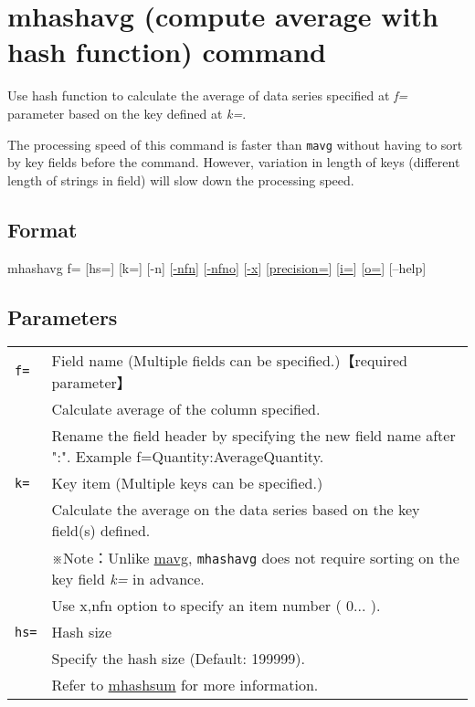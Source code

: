 \documentclass[a4paper]{jarticle}
\begin{document}
\setlength{\baselineskip}{4mm}

\section*{mhashavg (compute average with hash function) command}
Use hash function to calculate the average of data series specified at \emph{f=} parameter based on the key defined at \emph{k=}. 

The processing speed of this command is faster than \verb|mavg| without having to sort by key fields before the command. However, variation in length of keys (different length of strings in field) will slow down the processing speed. 

\subsection*{Format}
mhashavg f= [hs=] [k=] [-n] 
[\href{run:option.pdf}{-nfn}] 
[\href{run:option.pdf}{-nfno}] 
[\href{run:option.pdf}{-x}] 
[\href{run:option.pdf}{precision=}] 
[\href{run:option.pdf}{i=}] 
[\href{run:option.pdf}{o=}] 
[--help]\\

\subsection*{Parameters}
\begin{table}[htbp]
{\small
\begin{tabular}{ll}
\verb|f=|    & Field name (Multiple fields can be specified.)【required parameter】\\
& Calculate average of the column specified. \\
& Rename the field header by specifying the new field name after ":". Example f=Quantity:AverageQuantity. \\
\verb|k=|    & Key item (Multiple keys can be specified.)\\
& Calculate the average on the data series based on the key field(s) defined. \\
& ※Note：Unlike \href{run:mavg.pdf} {mavg}, \verb|mhashavg| does not require sorting on the key field \emph{k=} in advance.  \\
& Use x,nfn option to specify an item number ( 0... ).\\
\verb|hs=|    & Hash size \\
& Specify the hash size (Default: 199999).\\
& Refer to \href{run:mhashsum.pdf}{mhashsum} for more information.
\end{tabular} 
}
\end{table} 
\end{document}
